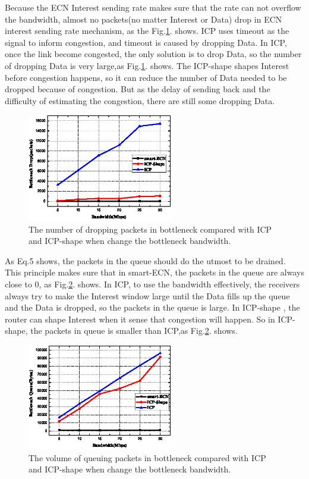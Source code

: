 Because the ECN Interest sending rate makes sure that the rate can not overflow the bandwidth, almost no packets(no matter Interest or Data) drop in ECN interest sending rate mechanism, as the Fig.\ref{fig-drop}. shows. ICP uses timeout as the signal to inform congestion, and timeout is caused by dropping Data. In ICP, once the link become congested, the only solution is to drop Data, so the number of dropping Data is very large,as Fig.\ref{fig-drop}. shows. The ICP-shape shapes Interest before congestion happens, so it can reduce the number of Data needed to be dropped because of congestion. But as the delay of sending back and the difficulty of estimating the congestion, there are still some dropping Data.
\begin{figure}[t]
\centering
\includegraphics[width=2.5in]{drop-pic-cut.eps}
\centering
\caption{The number of dropping packets in bottleneck compared with ICP and ICP-shape when change the bottleneck bandwidth.}
\label{fig-drop}
\end{figure}

As Eq.5 shows, the packets in the queue should do the utmost to be drained. This principle makes sure that in smart-ECN, the packets in the queue are always close to 0, as Fig.\ref{fig-queue}. shows. In ICP, to use the bandwidth effectively, the receivers always try to make the Interest window large until the Data fills up the queue and the Data is dropped, so the packets in the queue is large.  In ICP-shape , the router can shape Interest when it sense that congestion will happen. So in ICP-shape, the packets in queue is smaller than ICP,as Fig.\ref{fig-queue}. shows.
\begin{figure}[t]
\centering
\includegraphics[width=2.5in]{queu-pic-cut.eps}
\centering
\caption{The volume of queuing packets in bottleneck compared with ICP and ICP-shape when change the bottleneck bandwidth.}
\label{fig-queue}
\end{figure}

